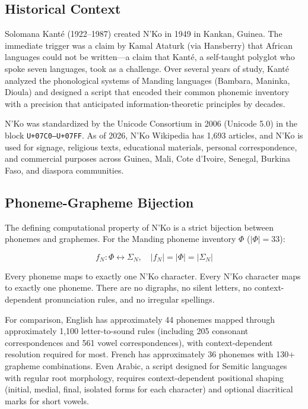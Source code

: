 \documentclass[11pt]{article}
\begin{document}
\subsection{Historical Context}

Solomana Kant\'{e} (1922--1987) created N'Ko in 1949 in Kankan, Guinea.
The immediate trigger was a claim by Kamal Ataturk (via Hansberry) that African languages could not be written---a claim that Kant\'{e}, a self-taught polyglot who spoke seven languages, took as a challenge.
Over several years of study, Kant\'{e} analyzed the phonological systems of Manding languages (Bambara, Maninka, Dioula) and designed a script that encoded their common phonemic inventory with a precision that anticipated information-theoretic principles by decades.

N'Ko was standardized by the Unicode Consortium in 2006 (Unicode 5.0) in the block \texttt{U+07C0--U+07FF}.
As of 2026, N'Ko Wikipedia has 1,693 articles, and N'Ko is used for signage, religious texts, educational materials, personal correspondence, and commercial purposes across Guinea, Mali, Cote d'Ivoire, Senegal, Burkina Faso, and diaspora communities.

\subsection{Phoneme-Grapheme Bijection}

The defining computational property of N'Ko is a strict bijection between phonemes and graphemes.
For the Manding phoneme inventory $\Phi$ ($|\Phi| = 33$):

\begin{equation}
f_N: \Phi \leftrightarrow \Sigma_N, \quad |f_N| = |\Phi| = |\Sigma_N|
\end{equation}

Every phoneme maps to exactly one N'Ko character.
Every N'Ko character maps to exactly one phoneme.
There are no digraphs, no silent letters, no context-dependent pronunciation rules, and no irregular spellings.

For comparison, English has approximately 44 phonemes mapped through approximately 1,100 letter-to-sound rules (including 205 consonant correspondences and 561 vowel correspondences), with context-dependent resolution required for most.
French has approximately 36 phonemes with 130+ grapheme combinations.
Even Arabic, a script designed for Semitic languages with regular root morphology, requires context-dependent positional shaping (initial, medial, final, isolated forms for each character) and optional diacritical marks for short vowels.
\end{document}
